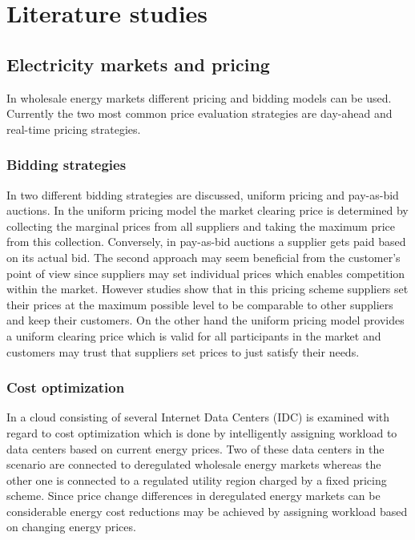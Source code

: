 

\section{Literature studies}

\subsection{Electricity markets and pricing}

In wholesale energy markets different pricing and bidding models can be used. Currently the two most common price evaluation strategies are day-ahead and real-time pricing strategies. 

\subsubsection{Bidding strategies}

In \cite{tierney2008uniform} two different bidding strategies are discussed, uniform pricing and pay-as-bid auctions. In the uniform pricing model the market clearing price is determined by collecting the marginal prices from all suppliers and taking the maximum price from this collection. Conversely, in pay-as-bid auctions a supplier gets paid based on its actual bid. 
The second approach may seem beneficial from the customer's point of view since suppliers may set individual prices which enables competition within the market. 
However studies show that in this pricing scheme suppliers set their prices at the maximum possible level to be comparable to other suppliers and keep their customers. On the other hand the uniform pricing model provides a uniform clearing price which is valid for all participants in the market and customers may trust that suppliers set prices to just satisfy their needs. 

\subsubsection{Cost optimization}

In \cite{rao2010minimizing} a cloud consisting of several Internet Data Centers (IDC) is examined with regard to cost optimization which is done by intelligently assigning workload to data centers based on current energy prices. Two of these data centers in the scenario are connected to deregulated wholesale energy markets whereas the other one is connected to a regulated utility region charged by a fixed pricing scheme. Since price change differences in deregulated energy markets can be considerable energy cost reductions may be achieved by assigning workload based on changing energy prices.  %


